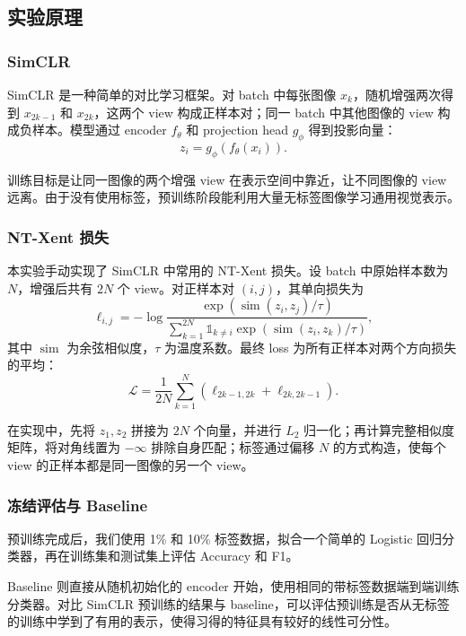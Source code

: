 \documentclass{ctexart}
\begin{document}
\subsection{实验原理}

\subsubsection{SimCLR}

SimCLR \cite{chen2020simclr} 是一种简单的对比学习框架。对 batch 中每张图像 $x_k$，随机增强两次得到 $x_{2k-1}$ 和 $x_{2k}$，这两个 view 构成正样本对；同一 batch 中其他图像的 view 构成负样本。模型通过 encoder $f_\theta$ 和 projection head $g_\phi$ 得到投影向量：
\[
    z_i = g_\phi(f_\theta(x_i)).
\]

训练目标是让同一图像的两个增强 view 在表示空间中靠近，让不同图像的 view 远离。由于没有使用标签，预训练阶段能利用大量无标签图像学习通用视觉表示。

\subsubsection{NT-Xent 损失}

本实验手动实现了 SimCLR 中常用的 NT-Xent 损失。设 batch 中原始样本数为 $N$，增强后共有 $2N$ 个 view。对正样本对 $(i,j)$，其单向损失为
\[
    \ell_{i,j}
    =
    -\log
    \frac{\exp(\operatorname{sim}(z_i,z_j)/\tau)}
    {\sum_{k=1}^{2N}\mathbb{1}_{k\ne i}\exp(\operatorname{sim}(z_i,z_k)/\tau)},
\]
其中 $\operatorname{sim}$ 为余弦相似度，$\tau$ 为温度系数。最终 loss 为所有正样本对两个方向损失的平均：
\[
    \mathcal{L}
    =
    \frac{1}{2N}
    \sum_{k=1}^{N}
    \left(
    \ell_{2k-1,2k} + \ell_{2k,2k-1}
    \right).
\]

在实现中，先将 $z_1,z_2$ 拼接为 $2N$ 个向量，并进行 $L_2$ 归一化；再计算完整相似度矩阵，将对角线置为 $-\infty$ 排除自身匹配；标签通过偏移 $N$ 的方式构造，使每个 view 的正样本都是同一图像的另一个 view。

\subsubsection{冻结评估与 Baseline}

预训练完成后，我们使用 1\% 和 10\% 标签数据，拟合一个简单的 Logistic 回归分类器，再在训练集和测试集上评估 Accuracy 和 F1。

Baseline 则直接从随机初始化的 encoder 开始，使用相同的带标签数据端到端训练分类器。对比 SimCLR 预训练的结果与 baseline，可以评估预训练是否从无标签的训练中学到了有用的表示，使得习得的特征具有较好的线性可分性。
\end{document}
